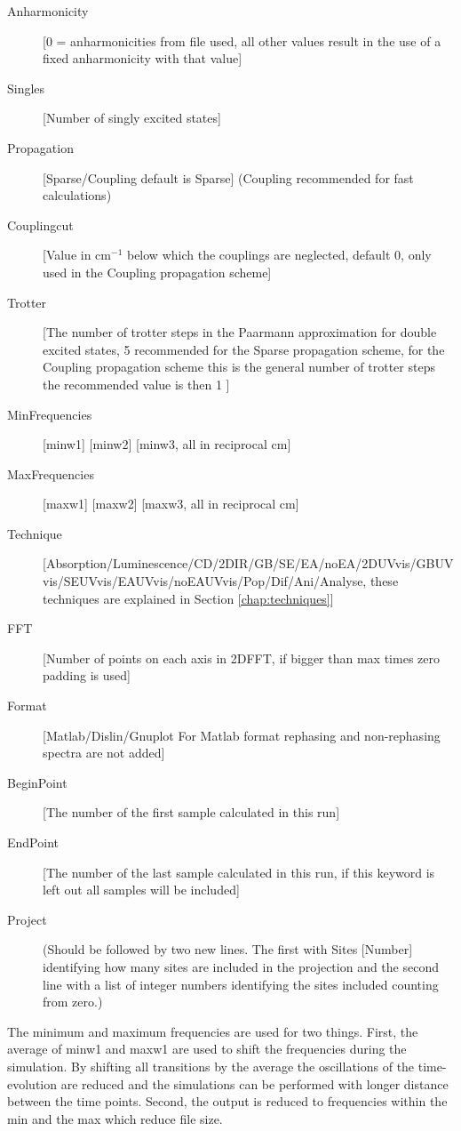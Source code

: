 \begin{description}
\item [Anharmonicity] [0 = anharmonicities from file used, all other values result in the use of a fixed anharmonicity with that value]
\item [Singles] [Number of singly excited states]
\item [Propagation] [Sparse/Coupling default is Sparse] (Coupling recommended for fast calculations)
\item [Couplingcut] [Value in cm$^{-1}$ below which the couplings are neglected, default 0, only used in the Coupling propagation scheme]
\item [Trotter] [The number of trotter steps in the Paarmann approximation for double excited 
states, 5 recommended for the Sparse propagation scheme, for the Coupling propagation scheme this is the general number of trotter steps the recommended value is then 1 ]
\item [MinFrequencies] [minw1] [minw2] [minw3, all in reciprocal cm]
\item [MaxFrequencies] [maxw1] [maxw2] [maxw3, all in reciprocal cm]
\item [Technique] [Absorption/Luminescence/CD/2DIR/GB/SE/EA/noEA/2DUVvis/GBUVvis/SEUVvis/EAUVvis/noEAUVvis/Pop/Dif/Ani/Analyse, these techniques are explained in Section \ref{chap:techniques}]
\item [FFT] [Number of points on each axis in 2DFFT, if bigger than max times zero padding is used]
\item [Format] [Matlab/Dislin/Gnuplot For Matlab format rephasing and non-rephasing spectra are not added] 
\item [BeginPoint] [The number of the first sample calculated in this run]
\item [EndPoint] [The number of the last sample calculated in this run, if this keyword is left out all samples will be included]
\item [Project] (Should be followed by two new lines. The first with Sites [Number] identifying how many sites are included in the projection and the second line with a list of integer numbers identifying the sites included counting from zero.)
\end{description}

The minimum and maximum frequencies are used for two things. First, the average of minw1 and maxw1 are used to shift the frequencies during the simulation. By shifting all transitions by the
average the oscillations of the time-evolution are reduced and the simulations can be performed with
longer distance between the time points. Second, the output is reduced to frequencies within the
min and the max which reduce file size.

